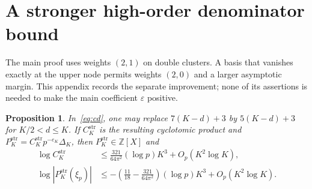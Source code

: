 \documentclass[11pt]{article}
\newtheorem{proposition}[theorem]{Proposition}
\theoremstyle{remark}
\newcommand{\Z}{\mathbb Z}
\newcommand{\eps}{\varepsilon}
\begin{document}
\appendix
\section{A stronger high-order denominator bound}\label{app:stronger}

The main proof uses weights $(2,1)$ on double clusters. A basis that
vanishes exactly at the upper node permits weights $(2,0)$ and a
larger asymptotic margin. This appendix records the separate improvement;
none of its assertions is needed to make the main coefficient
$\eps$ positive.

\begin{proposition}\label{prop:stronger}
In~\eqref{eq:cd}, one may replace $7(K-d)+3$ by $5(K-d)+3$ for
$K/2<d\le K$. If $C_K^{\mathrm{str}}$ is the resulting cyclotomic
product and $P_K^{\mathrm{str}}=C_K^{\mathrm{str}}p^{-e_K}\Delta_K$,
then $P_K^{\mathrm{str}}\in\Z[X]$ and
\begin{align*}
 \log C_K^{\mathrm{str}}
 &\le\frac{321}{64\pi^2}(\log p)K^3+O_p(K^2\log K),\\
 \log|P_K^{\mathrm{str}}(\xi_p)|
 &\le-\left(\frac{11}{18}-\frac{321}{64\pi^2}\right)
            (\log p)K^3+O_p(K^2\log K).
\end{align*}
\end{proposition}
\end{document}
